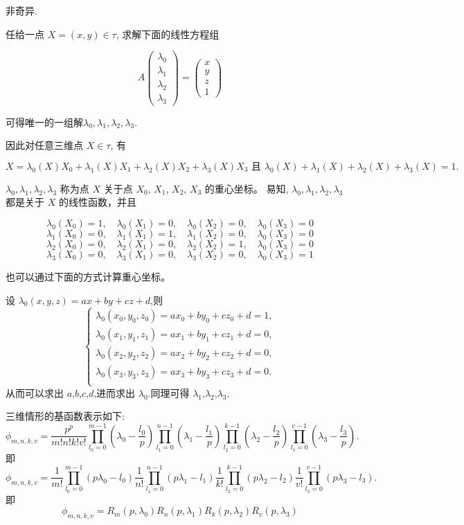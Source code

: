 \documentclass[12pt,a4paper]{article}
\begin{document}
非奇异. 

任给一点 $X=(x,y)\in\tau$, 求解下面的线性方程组

$$
A 
\begin{pmatrix}
\lambda_0 \\
\lambda_1\\
\lambda_2 \\
\lambda_3
\end{pmatrix}
=\begin{pmatrix}
x \\
y\\
z \\
1  
\end{pmatrix}
$$

可得唯一的一组解$\lambda_0,\lambda_1,\lambda_2, \lambda_3$. 

因此对任意三维点 $X\in\tau$, 有

$$
X=\lambda_0(X)X_0 + \lambda_1(X)X_1 + \lambda_2(X)X_2 + \lambda_3(X)X_3 
\text{ 且 } \lambda_0(X) + \lambda_1(X) + \lambda_2(X) + \lambda_3(X) = 1. 
$$

$\lambda_0,\lambda_1,\lambda_2, \lambda_3$ 称为点 $X$ 关于点 $X_0$, $X_1$, $X_2$, $X_3$ 的重心坐标。
易知, $\lambda_0, \lambda_1, \lambda_2, \lambda_3$ 都是关于 $X$ 的线性函数，并且

$$
\lambda_0(X_0) = 1,\quad \lambda_0(X_1) = 0,\quad \lambda_0(X_2) = 0,\quad \lambda_0(X_3) = 0
$$
$$\lambda_1(X_0) = 0,\quad \lambda_1(X_1) = 1,\quad \lambda_1(X_2) = 0,\quad \lambda_0(X_3) = 0
$$
$$
\lambda_2(X_0) = 0,\quad \lambda_2(X_1) = 0,\quad \lambda_2(X_2) = 1,\quad \lambda_0(X_3) = 0
$$
$$
\lambda_3(X_0) = 0,\quad \lambda_3(X_1) = 0,\quad \lambda_3(X_2) = 0,\quad \lambda_0(X_3) = 1
$$

也可以通过下面的方式计算重心坐标。

设 $\lambda_0 (x,y,z)=ax+by+cz+d$,则
$$
\begin{cases}
\lambda _0 (x_0,y_0,z_0)=ax_0+by_0+cz_0+d=1,\\
\lambda _0 (x_1,y_1,z_1)=ax_1+by_1+cz_1+d=0,\\
\lambda _0 (x_2,y_2,z_2)=ax_2+by_2+cz_2+d=0,\\
\lambda _0 (x_3,y_3,z_3)=ax_3+by_3+cz_3+d=0.\\
\end{cases}
$$
从而可以求出 $a$,$b$,$c$,$d$,进而求出 $\lambda _0$.同理可得 $\lambda _1$,$\lambda _2$,$\lambda _3$.

三维情形的基函数表示如下:
$$
\phi_{m,n,k,v} = \frac{p^p}{m!n!k!v!}\prod_{l_0 = 0}^{m - 1}
(\lambda_0 - \frac{l_0}{p}) \prod_{l_1 = 0}^{n-1}(\lambda_1 -
\frac{l_1}{p}) \prod_{l_2=0}^{k-1}(\lambda_2 - \frac{l_2}{p})\prod_{l_3=0}^{v-1}(\lambda_3 - \frac{l_3}{p}).
$$
即
$$
\phi_{m,n,k,v} = \frac{1}{m!}\prod_{l_0 = 0}^{m - 1}
(p\lambda_0 -l_0)\frac{1}{n!}\prod_{l_1 = 0}^{n-1}(p\lambda_1 -
l_1)\frac{1}{k!}\prod_{l_2=0}^{k-1}(p\lambda_2 -l_2)\frac{1}{v!}\prod_{l_3=0}^{v-1}(p\lambda_3 - l_3).
$$
即
$$
\phi_{m,n,k,v} =R_m (p,\lambda_0)R_n (p,\lambda_1)R_k (p,\lambda_2)R_v (p,\lambda_3)
$$
\end{document}
